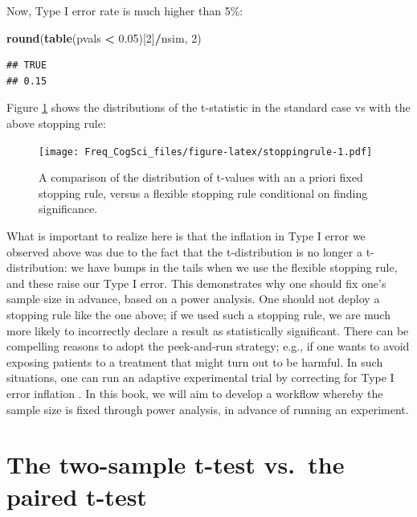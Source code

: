 \documentclass[12pt,]{krantz}
\newenvironment{Shaded}{\begin{snugshade}}{\end{snugshade}}
\newcommand{\DecValTok}[1]{\textcolor[rgb]{0.00,0.00,0.81}{#1}}
\newcommand{\FloatTok}[1]{\textcolor[rgb]{0.00,0.00,0.81}{#1}}
\newcommand{\KeywordTok}[1]{\textcolor[rgb]{0.13,0.29,0.53}{\textbf{#1}}}
\newcommand{\NormalTok}[1]{#1}
\newcommand{\OperatorTok}[1]{\textcolor[rgb]{0.81,0.36,0.00}{\textbf{#1}}}
\newcommand{\StringTok}[1]{\textcolor[rgb]{0.31,0.60,0.02}{#1}}
\begin{document}
Now, Type I error rate is much higher than 5\%:

\begin{Shaded}
\begin{Highlighting}[]
\KeywordTok{round}\NormalTok{(}\KeywordTok{table}\NormalTok{(pvals }\OperatorTok{<}\StringTok{ }\FloatTok{0.05}\NormalTok{)[}\DecValTok{2}\NormalTok{]}\OperatorTok{/}\NormalTok{nsim, }\DecValTok{2}\NormalTok{)}
\end{Highlighting}
\end{Shaded}

\begin{verbatim}
## TRUE 
## 0.15
\end{verbatim}

Figure \ref{fig:stoppingrule} shows the distributions of the t-statistic in the standard case vs with the above stopping rule:

\begin{figure}
\centering
\texttt{[image: Freq\_CogSci\_files/figure-latex/stoppingrule-1.pdf]}
\caption{\label{fig:stoppingrule}A comparison of the distribution of t-values with an a priori fixed stopping rule, versus a flexible stopping rule conditional on finding significance.}
\end{figure}

What is important to realize here is that the inflation in Type I error we observed above was due to the fact that the t-distribution is no longer a t-distribution: we have bumps in the tails when we use the flexible stopping rule, and these raise our Type I error. This demonstrates why one should fix one's sample size in advance, based on a power analysis. One should not deploy a stopping rule like the one above; if we used such a stopping rule, we are much more likely to incorrectly declare a result as statistically significant. There can be compelling reasons to adopt the peek-and-run strategy; e.g., if one wants to avoid exposing patients to a treatment that might turn out to be harmful. In such situations, one can run an adaptive experimental trial by correcting for Type I error inflation \citep{pocock2013clinical}. In this book, we will aim to develop a workflow whereby the sample size is fixed through power analysis, in advance of running an experiment.

\hypertarget{the-two-sample-t-test-vs.the-paired-t-test}{%
\section{The two-sample t-test vs.~the paired t-test}\label{the-two-sample-t-test-vs.the-paired-t-test}}
\end{document}
